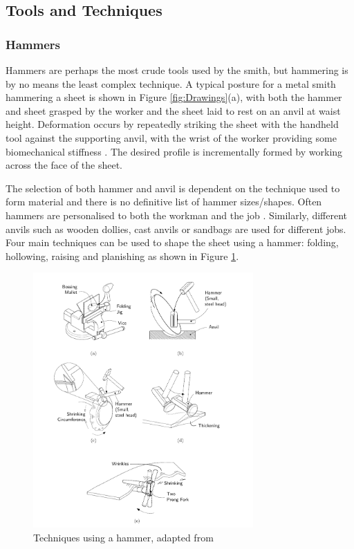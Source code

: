\subsection{Tools and Techniques} \label{sec:ManualTech}
\subsubsection{Hammers} \label{sec:ManualHammer}

Hammers are perhaps the most crude tools used by the smith, but hammering is by no means the least complex technique. A typical posture for a metal smith hammering a sheet is shown in Figure \ref{fig:Drawings}(a), with both the hammer and sheet grasped by the worker and the sheet laid to rest on an anvil at waist height. Deformation occurs by repeatedly striking the sheet with the handheld tool against the supporting anvil, with the wrist of the worker providing some biomechanical stiffness \citep{Phan2020EstimatingTask}. The desired profile is incrementally formed by working across the face of the sheet.

The selection of both hammer and anvil is dependent on the technique used to form material and there is no definitive list of hammer sizes/shapes. Often hammers are personalised to both the workman and the job \citep{Barr2013ProfessionalFabrication}. Similarly, different anvils such as wooden dollies, cast anvils or sandbags are used for different jobs. Four main techniques can be used to shape the sheet using a hammer: folding, hollowing, raising and planishing as shown in Figure \ref{fig:hammertech}. 

\begin{figure}[h]
    \centering
    \includegraphics[width=0.75\textwidth]{Images/HammeringTechDrawing.pdf}
    \caption{Techniques using a hammer, adapted from \citep{Timings2008SheetMetalwork}}
    \label{fig:hammertech}
\end{figure}

